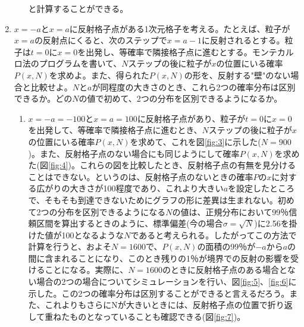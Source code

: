 \documentclass{jsarticle}
\begin{document}
\begin{enumerate}
\begin{enumerate}
                    と計算することができる。

                \end{enumerate}

            \item  $x=-a$と$x=a$に反射格子点がある1次元格子を考える。たとえば、粒子が$x=a$の反射点にくると、次のステップで$x=a-1$に反射されるとする。粒子は$t=0$に$x=0$を出発し、等確率で隣接格子点に進むとする。モンテカルロ法のプログラムを書いて、$N$ステップの後に粒子が$x$の位置にいる確率$P(x,N)$を求めよ。また、得られた$P(x,N)$の形を、反射する"壁"のない場合と比較せよ。$N$と$a$が同程度の大きさのとき、これら2つの確率分布は区別できるか。どの$N$の値で初めて、2つの分布を区別できるようになるか。

                \begin{enumerate}
                    \item $x=-a=-100$と$x=a=100$に反射格子点があり、粒子が$t=0$に$x=0$を出発して、等確率で隣接格子点に進むとき、$N$ステップの後に粒子が$x$の位置にいる確率$P(x,N)$を求めて、これを図\ref{fig:3}に示した($N=900$)。また、反射格子点のない場合にも同じようにして確率$P(x,N)$を求めた(図\ref{fig:4})。これらの図を比較したとき、反射格子点の有無を見分けることはできない。というのは、反射格子点のないときの確率$P$の$x$に対する広がりの大きさが100程度であり、これより大きい$a$を設定したところで、そもそも到達できないためにグラフの形に差異は生まれない。初めて2つの分布を区別できるようになる$N$の値は、正規分布において99％信頼区間を算出するときのように、標準偏差(今の場合$\sigma=\sqrt N$)に2.56を掛けた値が100となるような$N$であると考えられる。したがってこの方法で計算を行うと、およそ$N=1600$で、$P(x,N)$の面積の99％が$-a$から$a$の間に含まれることになり、このとき残りの1％が境界での反射の影響を受けることになる。実際に、$N=1600$のときに反射格子点のある場合とない場合の2つの場合についてシミュレーションを行い、図\ref{fig:5}、\ref{fig:6}に示した。この2つの確率分布は区別することができると言えるだろう。また、これよりもさらにNが大きいときには、反射格子点の位置で折り返して重ねたものとなっていることも確認できる(図\ref{fig:7})。


\end{enumerate}
\end{enumerate}
\end{document}
